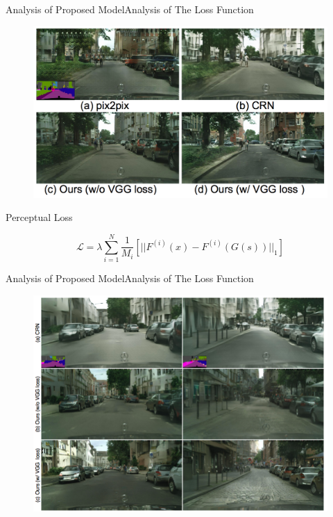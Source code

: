 \documentclass{beamer}
\begin{document}
\begin{frame}{Analysis of Proposed Model}{Analysis of The Loss Function}
\begin{figure}
	\centering
	\includegraphics[height=0.6\textheight]{images/result_1}
\end{figure}
%
%
\begin{beamerboxesrounded}[upper=uppercol,lower=lowercol,shadow=false]{Perceptual Loss }
	
\begin{equation}
\mathcal{L}=\lambda\sum_{i=1}^N \frac{1}{M_i}[||F^{(i)}(x)-F^{(i)}(G(s))||_1]
\end{equation}

\end{beamerboxesrounded}
\end{frame}


\begin{frame}{Analysis of Proposed Model}{Analysis of The Loss Function}
\begin{figure}
	\centering
	\includegraphics[height=0.8\textheight]{images/result_3}
\end{figure}
\end{frame}
\end{document}
